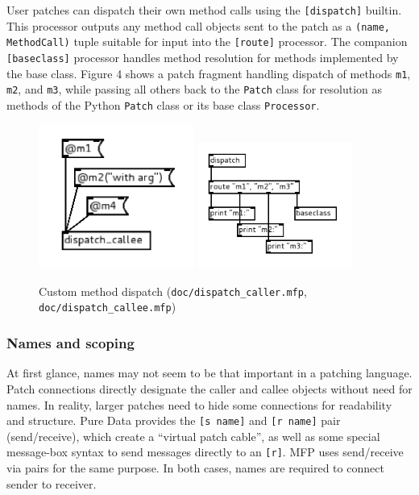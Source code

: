 \documentclass[11pt,a4paper]{article}
\begin{document}
User patches can dispatch their own method calls using the
\texttt{[dispatch]} builtin.  This processor outputs any method call
objects sent to the patch as a \texttt{(name, MethodCall)} tuple suitable
for input into the \texttt{[route]} processor.  The companion
\texttt{[baseclass]} processor handles method resolution for methods
implemented by the base class.  Figure 4 shows a patch fragment handling
dispatch of methods \texttt{m1}, \texttt{m2}, and \texttt{m3}, while
passing all others back to the \texttt{Patch} class for resolution as
methods of the Python \texttt{Patch} class or its base class
\texttt{Processor}.   

\begin{figure}
    \centering\includegraphics[width=2in]{dispatch_caller.png}
    \centering\includegraphics[width=2in]{dispatch_callee.png}
    \caption{Custom method dispatch
    (\texttt{doc/dispatch\_caller.mfp}, \texttt{doc/dispatch\_callee.mfp})}
\end{figure}

\subsubsection{Names and scoping}

At first glance, names may not seem to be that important in a patching
language.  Patch connections directly designate the caller and callee
objects without need for names.  In reality, larger patches need to hide
some connections for readability and structure.  Pure Data provides the
\texttt{[s name]} and \texttt{[r name]} pair (send/receive), which create a
``virtual patch cable'', as well as some special message-box syntax to send
messages directly to an \texttt{[r]}.  MFP uses send/receive via pairs for
the same purpose.  In both cases, names are required to connect sender to
receiver.
\end{document}
